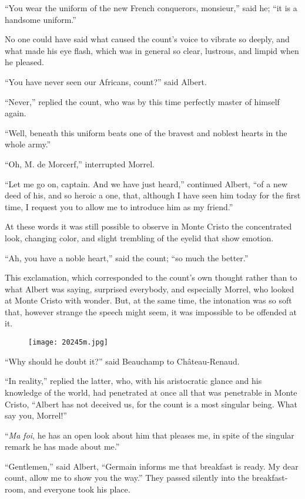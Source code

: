 “You wear the uniform of the new French conquerors, monsieur,” said he;
“it is a handsome uniform.”

No one could have said what caused the count’s voice to vibrate so
deeply, and what made his eye flash, which was in general so clear,
lustrous, and limpid when he pleased.

“You have never seen our Africans, count?” said Albert.

“Never,” replied the count, who was by this time perfectly master of
himself again.

“Well, beneath this uniform beats one of the bravest and noblest hearts
in the whole army.”

“Oh, M. de Morcerf,” interrupted Morrel.

“Let me go on, captain. And we have just heard,” continued Albert, “of
a new deed of his, and so heroic a one, that, although I have seen him
today for the first time, I request you to allow me to introduce him as
my friend.”

At these words it was still possible to observe in Monte Cristo the
concentrated look, changing color, and slight trembling of the eyelid
that show emotion.

“Ah, you have a noble heart,” said the count; “so much the better.”

This exclamation, which corresponded to the count’s own thought rather
than to what Albert was saying, surprised everybody, and especially
Morrel, who looked at Monte Cristo with wonder. But, at the same time,
the intonation was so soft that, however strange the speech might seem,
it was impossible to be offended at it.

\begin{figure}[ht]
\texttt{[image: 20245m.jpg]}
\end{figure}

“Why should he doubt it?” said Beauchamp to Château-Renaud.

“In reality,” replied the latter, who, with his aristocratic glance and
his knowledge of the world, had penetrated at once all that was
penetrable in Monte Cristo, “Albert has not deceived us, for the count
is a most singular being. What say you, Morrel!”

“\textit{Ma foi}, he has an open look about him that pleases me, in spite of
the singular remark he has made about me.”

“Gentlemen,” said Albert, “Germain informs me that breakfast is ready.
My dear count, allow me to show you the way.” They passed silently into
the breakfast-room, and everyone took his place.

